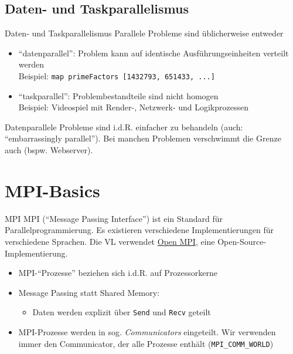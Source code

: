\documentclass{beamer}
\begin{document}
\subsection{Daten- und Taskparallelismus}

\begin{frame}{Daten- und Taskparallelismus}
	Parallele Probleme sind üblicherweise entweder
	
	\begin{itemize}
		\item \enquote{datenparallel}: Problem kann auf identische Ausführungseinheiten verteilt werden\\
			Beispiel: \texttt{map primeFactors [1432793, 651433, ...]}

		\item \enquote{taskparallel}: Problembestandteile sind nicht homogen\\
			Beispiel: Videospiel mit Render-, Netzwerk- und Logikprozessen
	\end{itemize}

	Datenparallele Probleme sind i.d.R. einfacher zu behandeln (auch: \enquote{embarrassingly parallel}).
	Bei manchen Problemen verschwimmt die Grenze auch (bspw. Webserver).
\end{frame}

\section{MPI-Basics}

\begin{frame}{MPI}
	MPI (\enquote{Message Passing Interface}) ist ein Standard für Parallelprogrammierung.
	Es existieren verschiedene Implementierungen für verschiedene Sprachen.
	Die VL verwendet \href{https://www.open-mpi.org/}{Open MPI}, eine Open-Source-Implementierung.

	\begin{itemize}
		\item MPI-\enquote{Prozesse} beziehen sich i.d.R. auf Prozessorkerne
		\item Message Passing statt Shared Memory:
		\begin{itemize}
			\item Daten werden explizit über \texttt{Send} und \texttt{Recv} geteilt
		\end{itemize}
		\item MPI-Prozesse werden in sog. \emph{Communicators} eingeteilt. Wir verwenden immer den Communicator, der alle Prozesse enthält (\texttt{MPI\_COMM\_WORLD})
	\end{itemize}
\end{frame}
\end{document}
